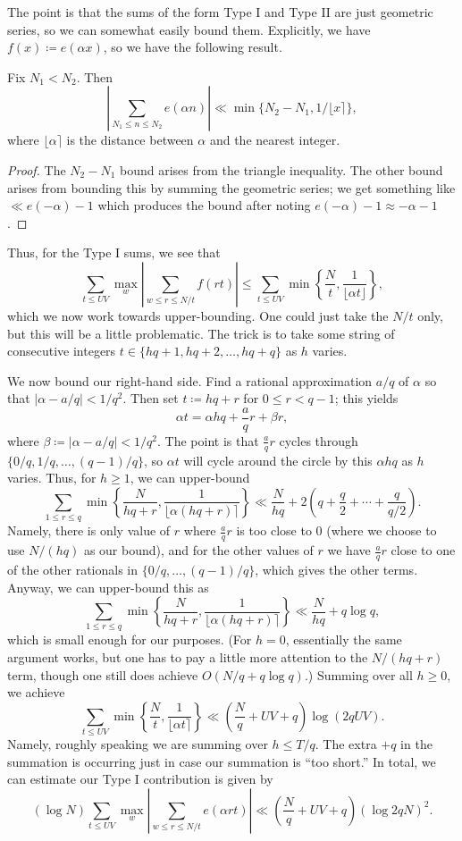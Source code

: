 \documentclass[../notes.tex]{subfiles}
\begin{document}
The point is that the sums of the form Type I and Type II are just geometric series, so we can somewhat easily bound them. Explicitly, we have $f(x)\coloneqq e(\alpha x)$, so we have the following result.
\begin{lemma}
	Fix $N_1<N_2$. Then
	\[\left|\sum_{N_1\le n\le N_2}e(\alpha n)\right|\ll\min\{N_2-N_1,1/\lfloor x\rceil\},\]
	where $\lfloor\alpha\rceil$ is the distance between $\alpha$ and the nearest integer.
\end{lemma}
\begin{proof}
	The $N_2-N_1$ bound arises from the triangle inequality. The other bound arises from bounding this by summing the geometric series; we get something like $\ll e(-\alpha)-1$ which produces the bound after noting $e(-\alpha)-1\approx-\alpha-1$.
\end{proof}
Thus, for the Type I sums, we see that
\[\sum_{t\le UV}\max_w\left|\sum_{w\le r\le N/t}f(rt)\right|\le\sum_{t\le UV}\min\left\{\frac Nt,\frac1{\lfloor\alpha t\rfloor}\right\},\]
which we now work towards upper-bounding. One could just take the $N/t$ only, but this will be a little problematic. The trick is to take some string of consecutive integers $t\in\{hq+1,hq+2,\ldots,hq+q\}$ as $h$ varies.

We now bound our right-hand side. Find a rational approximation $a/q$ of $\alpha$ so that $|\alpha-a/q|<1/q^2$. Then set $t\coloneqq hq+r$ for $0\le r<q-1$; this yields
\[\alpha t=\alpha hq+\frac aqr+\beta r,\]
where $\beta\coloneqq|\alpha-a/q|<1/q^2$. The point is that $\frac aqr$ cycles through $\{0/q,1/q,\ldots,(q-1)/q\}$, so $\alpha t$ will cycle around the circle by this $\alpha hq$ as $h$ varies. Thus, for $h\ge1$, we can upper-bound
\[\sum_{1\le r\le q}\min\left\{\frac N{hq+r},\frac1{\lfloor\alpha(hq+r)\rceil}\right\}\ll\frac N{hq}+2\left(q+\frac q2+\cdots+\frac q{q/2}\right).\]
Namely, there is only value of $r$ where $\frac aqr$ is too close to $0$ (where we choose to use $N/(hq)$ as our bound), and for the other values of $r$ we have $\frac aqr$ close to one of the other rationals in $\{0/q,\ldots,(q-1)/q\}$, which gives the other terms. Anyway, we can upper-bound this as
\[\sum_{1\le r\le q}\min\left\{\frac N{hq+r},\frac1{\lfloor\alpha(hq+r)\rceil}\right\}\ll\frac N{hq}+q\log q,\]
which is small enough for our purposes. (For $h=0$, essentially the same argument works, but one has to pay a little more attention to the $N/(hq+r)$ term, though one still does achieve $O(N/q+q\log q)$.) Summing over all $h\ge0$, we achieve
\[\sum_{t\le UV}\min\left\{\frac Nt,\frac1{\lfloor\alpha t\rceil}\right\}\ll\left(\frac Nq+UV+q\right)\log(2qUV).\]
Namely, roughly speaking we are summing over $h\le T/q$. The extra $+q$ in the summation is occurring just in case our summation is ``too short.'' In total, we can estimate our Type I contribution is given by
\[(\log N)\sum_{t\le UV}\max_w\left|\sum_{w\le r\le N/t}e(\alpha rt)\right|\ll\left(\frac Nq+UV+q\right)(\log2qN)^2.\]
\end{document}
